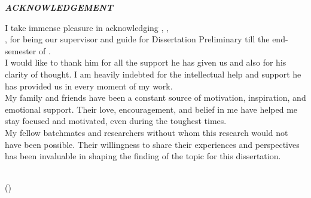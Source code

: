 \begin{center}
    {\Large \textbf{\emph{ACKNOWLEDGEMENT}}}
\end{center}

\vspace{10pt}
\begin{spacing}{1.5}
I take immense pleasure in acknowledging \SupervisorName, \SupervisorPosition, \\ \SupervisorDept, \Universtiy \hspace{1pt} for being our supervisor and guide for Dissertation Preliminary till the end-semester of \Semester.
\vspace{8pt}
\\
I would like to thank him for all the support he has given us and also for his clarity of thought. I am heavily indebted for the intellectual help and support he has provided us in every moment of my work. 
\vspace{8pt}
\\
My family and friends have been a constant source of motivation, inspiration, and emotional support. Their love, encouragement, and belief in me have helped me stay focused and motivated, even during the toughest times.
\vspace{8pt}
\\
My fellow batchmates and researchers without whom this research would not have been possible. Their willingness to share their experiences and perspectives has been invaluable in shaping the finding of the topic for this dissertation.
\end{spacing}
\vspace{100pt}

\begin{multicols}{2}
    \begin{center}
        {\StudentName} \\ 
        {(\StudentAdminNo)}
    \end{center}

    \columnbreak
        
    \begin{center}
        
    \end{center}
\end{multicols}